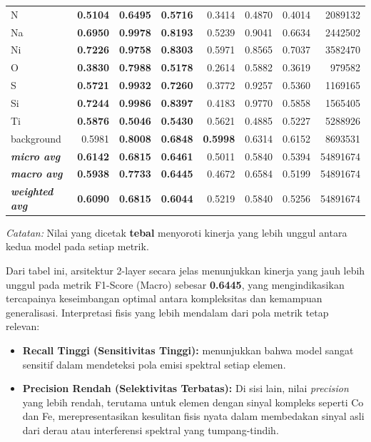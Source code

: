 \begin{table}[H]
\begin{threeparttable}
\begin{tabular}{l rrr rrr r}
        N  & \textbf{0.5104} & \textbf{0.6495} & \textbf{0.5716} & 0.3414 & 0.4870 & 0.4014 & 2089132 \\
        Na & \textbf{0.6950} & \textbf{0.9978} & \textbf{0.8193} & 0.5239 & 0.9041 & 0.6634 & 2442502 \\
        Ni & \textbf{0.7226} & \textbf{0.9758} & \textbf{0.8303} & 0.5971 & 0.8565 & 0.7037 & 3582470 \\
        O  & \textbf{0.3830} & \textbf{0.7988} & \textbf{0.5178} & 0.2614 & 0.5882 & 0.3619 & 979582 \\
        S  & \textbf{0.5721} & \textbf{0.9932} & \textbf{0.7260} & 0.3772 & 0.9257 & 0.5360 & 1169165 \\
        Si & \textbf{0.7244} & \textbf{0.9986} & \textbf{0.8397} & 0.4183 & 0.9770 & 0.5858 & 1565405 \\
        Ti & \textbf{0.5876} & \textbf{0.5046} & \textbf{0.5430} & 0.5621 & 0.4885 & 0.5227 & 5288926 \\
        background & 0.5981 & \textbf{0.8008} & \textbf{0.6848} & \textbf{0.5998} & 0.6314 & 0.6152 & 8693531 \\
        \midrule
        \textbf{\textit{micro avg}}    & \textbf{0.6142} & \textbf{0.6815} & \textbf{0.6461} & 0.5011 & 0.5840 & 0.5394 & 54891674 \\
        \textbf{\textit{macro avg}}    & \textbf{0.5938} & \textbf{0.7733} & \textbf{0.6445} & 0.4672 & 0.6584 & 0.5199 & 54891674 \\
        \textbf{\textit{weighted avg}} & \textbf{0.6090} & \textbf{0.6815} & \textbf{0.6044} & 0.5219 & 0.5840 & 0.5256 & 54891674 \\
        \bottomrule
    \end{tabular}
    \begin{tablenotes}
      \small
      \item \textit{Catatan:} Nilai yang dicetak \textbf{tebal} menyoroti kinerja yang lebih unggul antara kedua model pada setiap metrik.
    \end{tablenotes}
    \end{threeparttable}
\end{table}

Dari tabel ini, arsitektur 2-layer secara jelas menunjukkan kinerja yang jauh lebih unggul pada metrik F1-Score (Macro) sebesar \textbf{0.6445}, yang mengindikasikan tercapainya keseimbangan optimal antara kompleksitas dan kemampuan generalisasi. Interpretasi fisis yang lebih mendalam dari pola metrik tetap relevan:
\begin{itemize}
    \item \textbf{Recall Tinggi (Sensitivitas Tinggi):} menunjukkan bahwa model sangat sensitif dalam mendeteksi pola emisi spektral setiap elemen.
    \item \textbf{Precision Rendah (Selektivitas Terbatas):} Di sisi lain, nilai \textit{precision} yang lebih rendah, terutama untuk elemen dengan sinyal kompleks seperti Co dan Fe, merepresentasikan kesulitan fisis nyata dalam membedakan sinyal asli dari derau atau interferensi spektral yang tumpang-tindih.
\end{itemize}

